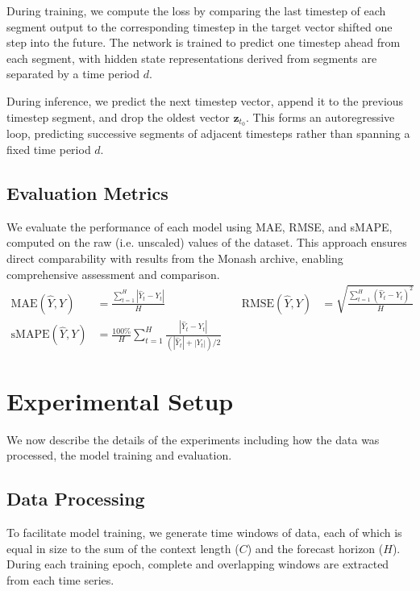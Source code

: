 \documentclass{article}
\newcommand{\horizon}{H}
\newcommand{\contextlength}{C}
\newcommand{\ts}{t}
\begin{document}
During training, we compute the loss by comparing the last timestep of each segment output to the corresponding timestep in the 
target vector shifted one step into the future. The network is trained to predict one timestep ahead from each segment, with hidden 
state representations derived from segments are separated by a time period $d$.

During inference, we predict the next timestep vector, append it to the previous timestep segment, and drop the oldest vector $\mathbf{z}_{t_0}$. 
This forms an autoregressive loop, predicting successive segments of adjacent timesteps rather than spanning a fixed time period $d$.

\subsection{Evaluation Metrics}
We evaluate the performance of each model using MAE, RMSE, and sMAPE, computed on the raw (i.e. unscaled) 
values of the dataset. This approach ensures direct comparability with results from 
the Monash archive\cite{DBLP:conf/nips/GodahewaBWHM21}, enabling comprehensive assessment and comparison.
\begin{equation*}
\begin{aligned}
\text{MAE}(\hat{Y}, Y) &= \frac{ \sum_{\ts=1}^{\horizon}|\hat{Y}_\ts - Y_\ts|}{\horizon} &
\quad
\text{RMSE}(\hat{Y}, Y) &= \sqrt{\frac{\sum_{\ts=1}^{\horizon}(\hat{Y}_\ts - Y_\ts)^2}{\horizon}} \\
\text{sMAPE}(\hat{Y}, Y) &= \frac{100\%}{\horizon}\sum_{\ts=1}^{\horizon}\frac{|\hat{Y}_\ts - Y_\ts|}{(|\hat{Y}_\ts| + |Y_\ts|)/2}
\end{aligned}
\end{equation*}
\section{Experimental Setup}
We now describe the details of the experiments including how the data was processed, the 
model training and evaluation.

\subsection{Data Processing}
To facilitate model training, we generate time windows of data, each of which is equal in 
size to the sum of the context length ($\contextlength$) and the forecast horizon ($\horizon$). During each training epoch, 
complete and overlapping windows are extracted from each time series. 
\end{document}
